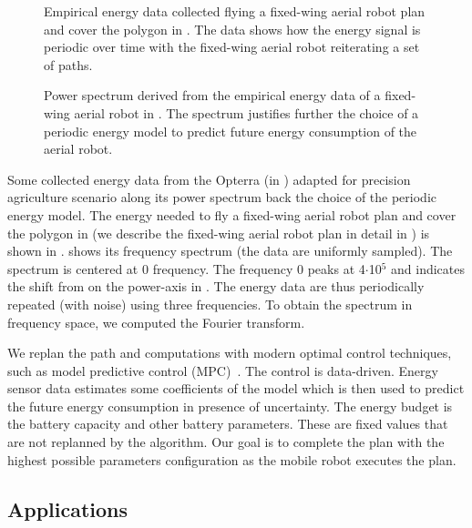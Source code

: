 \begin{figure}[p]
  \centering
  \footnotesize{}
  
  \caption[Energy data of a fixed-wing aerial robot]{Empirical energy data collected flying a fixed-wing aerial robot plan and cover the polygon in . The data shows how the energy signal is periodic over time with the fixed-wing aerial robot reiterating a set of paths.}
  \label{fig:energy-1}
\end{figure}
\begin{figure}[p]
  \centering
  \footnotesize{}
  
  \caption[Power spectrum of the energy data of a fixed-wing aerial robot]{Power spectrum derived from the empirical energy data of a fixed-wing aerial robot in . The spectrum justifies further the choice of a periodic energy model to predict future energy consumption of the aerial robot.}
  \label{fig:spectrum-1}
\end{figure}

Some collected energy data from the Opterra (in ) adapted for precision agriculture scenario along its power spectrum back the choice of the periodic energy model. The energy needed to fly a fixed-wing aerial robot plan and cover the polygon in  (we describe the fixed-wing aerial robot plan in detail in ) is shown in .  shows its frequency spectrum (the data are uniformly sampled).  The spectrum is centered at 0 frequency. The frequency 0 peaks at 4$\cdot$10${}^{5}$ and indicates the shift from on the power-axis in . The energy data are thus periodically repeated (with noise) using three frequencies. To obtain the spectrum in frequency space, we computed the Fourier transform.

We replan the path and computations with modern optimal control techniques, such as model predictive control (MPC)~\citep{rawlings2017model}. The control is data-driven. Energy sensor data estimates some coefficients of the model which is then used to predict the future energy consumption in presence of uncertainty. The energy budget is the battery capacity and other battery parameters. These are fixed values that are not replanned by the algorithm. Our goal is to complete the plan with the highest possible parameters configuration as the mobile robot executes the plan. 

\subsection{Applications}

